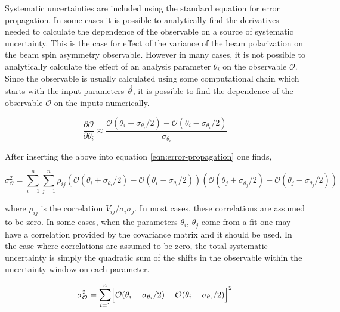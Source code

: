 
Systematic uncertainties are included using the standard equation for error propagation.  In some cases it is possible to analytically find the derivatives needed to calculate the dependence of the observable on a source of systematic uncertainty.  This is the case for effect of the variance of the beam polarization on the beam spin asymmetry observable.  However in many cases, it is not possible to analytically calculate the effect of an analysis parameter $\theta_i$ on the observable $\mathcal{O}$.  Since the observable is usually calculated using some computational chain which starts with the input parameters $\vec{\theta}$, it is possible to find the dependence of the observable $\mathcal{O}$ on the inputs numerically.

\begin{equation}
  \frac{\partial \mathcal{O}}{ \partial \theta_i} \approx \frac{\mathcal{O}(\theta_i + \sigma_{\theta_i}/2) - \mathcal{O}(\theta_i - \sigma_{\theta_i}/2)}{\sigma_{\theta_i}}
\end{equation}

After inserting the above into equation \ref{eqn:error-propagation} one finds,

\begin{equation}
  \sigma_{\mathcal{O}}^{2} = \sum_{i=1}^{n} \sum_{j=1}^{n} \rho_{ij} (\mathcal{O}(\theta_i + \sigma_{\theta_i}/2) - \mathcal{O}(\theta_i - \sigma_{\theta_i}/2)) (\mathcal{O}(\theta_j + \sigma_{\theta_j}/2) - \mathcal{O}(\theta_j - \sigma_{\theta_j}/2)) 
\end{equation}

where $\rho_{ij}$ is the correlation $V_{ij}/\sigma_i \sigma_j$.  In most cases, these correlations are assumed to be zero.  In some cases, when the parameters $\theta_i$, $\theta_j$ come from a fit one may have a correlation provided by the covariance matrix and it should be used.  In the case where correlations are assumed to be zero, the total systematic uncertainty is simply the quadratic sum of the shifts in the observable within the uncertainty window on each parameter.

\begin{equation}
  \sigma_{\mathcal{O}}^{2} = \sum_{i=1}^{n} \Bigl[ \mathcal{O}(\theta_i + \sigma_{\theta_i}/2) - \mathcal{O}(\theta_i - \sigma_{\theta_i}/2) \Bigr]^2
\end{equation}

